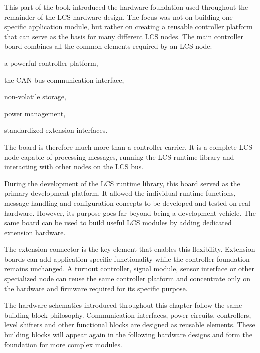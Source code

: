 %

This part of the book introduced the hardware foundation used throughout the 
remainder of the LCS hardware design. The focus was not on building one specific
application module, but rather on creating a reusable controller platform
that can serve as the basis for many different LCS nodes.
The main controller board combines all the common elements required by an LCS
node:

\begin{smallGapItemize}
\item a powerful controller platform,
\item the CAN bus communication interface,
\item non-volatile storage,
\item power management,
\item standardized extension interfaces.
\end{smallGapItemize}

The board is therefore much more than a controller carrier. It is a complete
LCS node capable of processing messages, running the LCS runtime library and
interacting with other nodes on the LCS bus.

During the development of the LCS runtime library, this board served as the
primary development platform. It allowed the individual runtime functions,
message handling and configuration concepts to be developed and tested on
real hardware. However, its purpose goes far beyond being a development
vehicle. The same board can be used to build useful LCS modules by adding
dedicated extension hardware.

The extension connector is the key element that enables this flexibility.
Extension boards can add application specific functionality while the
controller foundation remains unchanged. A turnout controller, signal module,
sensor interface or other specialized node can reuse the same controller
platform and concentrate only on the hardware and firmware required for its
specific purpose.

The hardware schematics introduced throughout this chapter follow the same
building block philosophy. Communication interfaces, power circuits,
controllers, level shifters and other functional blocks are designed as
reusable elements. These building blocks will appear again in the following
hardware designs and form the foundation for more complex modules.

